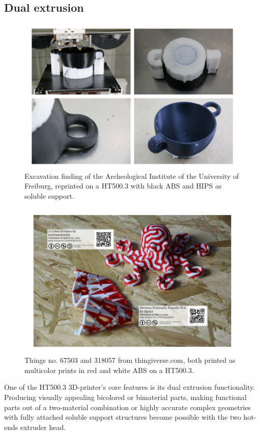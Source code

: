 \subsection{Dual extrusion} \label{sec_dualextrusion}

\begin{figure}[H]
  \centering
  \includegraphics[width=.7\linewidth]{./img/header_dual_extrusion.png}
  \caption{Excavation finding of the Archeological Institute of the University of Freiburg,
           reprinted on a HT500.3 with black ABS and HIPS as soluble support.}
\end{figure}

\begin{figure}[H]
  \centering
  \includegraphics[width=.7\linewidth]{./img/dual_extrusion_multicolor.png}
  \caption{Things no. 67503 and 318057 from thingiverse.com,
           both printed as multicolor prints in red and white ABS on a HT500.3.}
\end{figure}

One of the HT500.3 3D-printer's core features is its dual extrusion functionality. Producing visually appealing bicolored or bimaterial parts, making functional parts out of a two-material combination or highly accurate complex geometries with fully attached soluble support structures become possible with the two hot-ends extruder head. 


